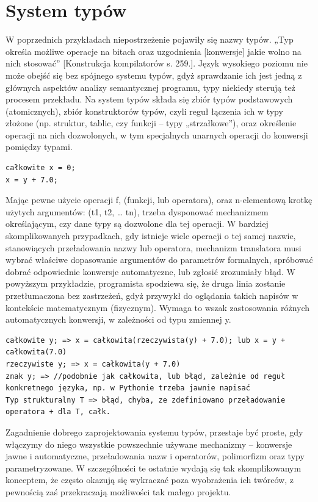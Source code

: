 \section{System typów}
W poprzednich przykładach niepostrzeżenie pojawiły się nazwy typów. „Typ określa możliwe operacje na bitach oraz uzgodnienia [konwersje] jakie wolno na nich stosować” [Konstrukcja kompilatorów s. 259.]. Język wysokiego poziomu nie może obejść się bez spójnego systemu typów, gdyż sprawdzanie ich jest jedną z głównych aspektów analizy semantycznej programu, typy niekiedy sterują też procesem przekładu.
Na system typów składa się zbiór typów podstawowych (atomicznych), zbiór konstruktorów typów, czyli reguł łączenia ich w typy złożone (np. struktur, tablic, czy funkcji – typy „strzałkowe”), oraz określenie operacji na nich dozwolonych, w tym specjalnych unarnych operacji do konwersji pomiędzy typami.
\begin{lstlisting}
całkowite x = 0;
x = y + 7.0;
\end{lstlisting}
Mając pewne użycie operacji f, (funkcji, lub operatora), oraz n-elementową krotkę użytych argumentów: (t1, t2, … tn), trzeba dysponować mechanizmem określającym, czy dane typy są dozwolone dla tej operacji. W bardziej skomplikowanych przypadkach, gdy istnieje wiele operacji o tej samej nazwie,  stanowiących przeładowania nazwy lub operatora, mechanizm translatora musi wybrać właściwe dopasowanie argumentów do parametrów formalnych, spróbować dobrać odpowiednie konwersje automatyczne, lub zgłosić zrozumiały błąd.
W powyższym przykładzie, programista spodziewa się, że druga linia zostanie przetłumaczona bez zastrzeżeń, gdyż przywykł do oglądania takich napisów w kontekście matematycznym (fizycznym). Wymaga to wszak zastosowania różnych automatycznych konwersji, w zależności od typu zmiennej y.
\begin{lstlisting}
całkowite y; => x = całkowita(rzeczywista(y) + 7.0); lub x = y + całkowita(7.0)
rzeczywiste y; => x = całkowita(y + 7.0)
znak y; => //podobnie jak całkowita, lub błąd, zależnie od reguł konkretnego języka, np. w Pythonie trzeba jawnie napisać 
Typ strukturalny T => błąd, chyba, ze zdefiniowano przeładowanie operatora + dla T, całk.
\end{lstlisting}
Zagadnienie dobrego zaprojektowania systemu typów, przestaje być proste, gdy włączymy do niego wszystkie powszechnie używane mechanizmy – konwersje jawne i automatyczne, przeładowania nazw i operatorów, polimorfizm oraz typy parametryzowane. W szczególności te ostatnie wydają się tak skomplikowanym konceptem, że często okazują się wykraczać poza wyobrażenia ich twórców\cite{cpp_templates_turing_complete}\cite{taming_wildcards_java}, z pewnością zaś przekraczają możliwości tak małego projektu.
